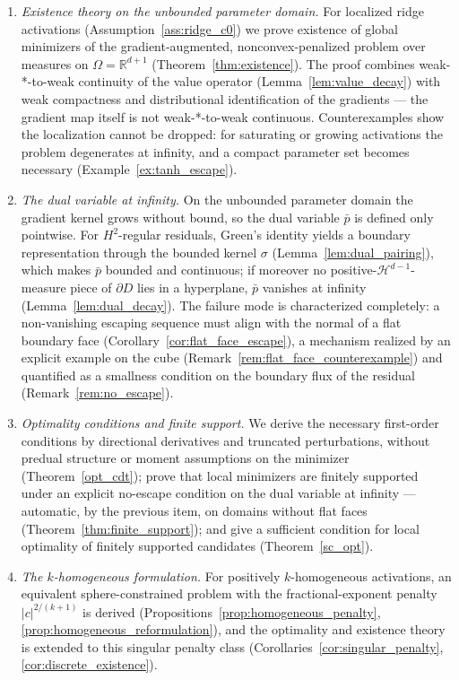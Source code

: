 \documentclass[11pt]{amsart}
\theoremstyle{definition}
\theoremstyle{remark}
\begin{document}
\begin{enumerate}
	\item \emph{Existence theory on the unbounded parameter domain.} For
	localized ridge activations (Assumption~\ref{ass:ridge_c0}) we prove
	existence of global minimizers of the gradient-augmented,
	nonconvex-penalized problem over measures on $\Omega = \mathbb{R}^{d+1}$
	(Theorem~\ref{thm:existence}). The proof combines weak-*-to-weak continuity
	of the value operator (Lemma~\ref{lem:value_decay}) with weak compactness
	and distributional identification of the gradients --- the gradient map
	itself is not weak-*-to-weak continuous. Counterexamples show the
	localization cannot be dropped: for saturating or growing activations
	the problem degenerates at infinity, and a compact
	parameter set becomes necessary (Example~\ref{ex:tanh_escape}).
	\item \emph{The dual variable at infinity.} On the unbounded parameter
	domain the gradient kernel grows without bound, so the dual variable
	$\bar{p}$ is defined only pointwise. For $H^2$-regular residuals, Green's
	identity yields a boundary representation through the bounded kernel
	$\sigma$ (Lemma~\ref{lem:dual_pairing}), which makes $\bar{p}$ bounded and
	continuous; if moreover no positive-$\mathcal{H}^{d-1}$-measure piece of
	$\partial D$ lies in a hyperplane, $\bar{p}$ vanishes at infinity
	(Lemma~\ref{lem:dual_decay}). The failure mode is characterized completely:
	a non-vanishing escaping sequence must align with the normal of a flat
	boundary face (Corollary~\ref{cor:flat_face_escape}), a mechanism realized
	by an explicit example on the cube
	(Remark~\ref{rem:flat_face_counterexample}) and quantified as a smallness
	condition on the boundary flux of the residual (Remark~\ref{rem:no_escape}).
	\item \emph{Optimality conditions and finite support.} We derive the
	necessary first-order conditions by directional derivatives and truncated
	perturbations, without predual structure or moment assumptions on the
	minimizer (Theorem~\ref{opt_cdt}); prove that local minimizers are finitely
	supported under an explicit no-escape condition on the dual variable at
	infinity --- automatic, by the previous item, on domains without flat faces
	(Theorem~\ref{thm:finite_support}); and give a sufficient condition for
	local optimality of finitely supported candidates (Theorem~\ref{sc_opt}).
	\item \emph{The $k$-homogeneous formulation.} For positively $k$-homogeneous activations, an equivalent sphere-constrained problem with the fractional-exponent penalty $|c|^{2/(k+1)}$ is derived (Propositions~\ref{prop:homogeneous_penalty}, \ref{prop:homogeneous_reformulation}), and the optimality and existence theory is extended to this singular penalty class (Corollaries~\ref{cor:singular_penalty}, \ref{cor:discrete_existence}).
\end{enumerate}
\end{document}

